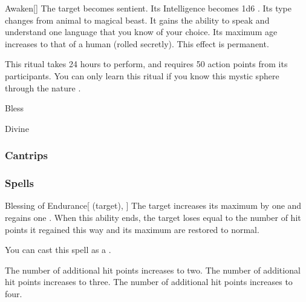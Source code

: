 \lowercase{\hypertarget{spell:Awaken}{}}\label{spell:Awaken}
\begin{apability}[Rank 6]{\hypertarget{spell:Awaken}{Awaken}}[]
The target becomes sentient.
Its Intelligence becomes 1d6 .
Its type changes from animal to magical beast.
It gains the ability to speak and understand one language that you know of your choice.
Its maximum age increases to that of a human (rolled secretly).
This effect is permanent.

This ritual takes 24 hours to perform, and requires 50 action points from its participants.
You can only learn this ritual if you know this mystic sphere through the nature .
\end{apability}
\vspace{0.25em}


\newpage
\begin{spellsection}{Bless}

\begin{spellheader}
\end{spellheader}


 Divine

\subsubsection{Cantrips}


\end{spellsection}


\subsubsection{Spells}


\lowercase{\hypertarget{spell:Blessing of Endurance}{}}\label{spell:Blessing of Endurance}
\begin{attuneability}[Rank 1]{\hypertarget{spell:Blessing of Endurance}{Blessing of Endurance}}[ (target), ]
The target increases its maximum  by one and regains one .
When this ability ends, the target loses  equal to the number of hit points it regained this way and its maximum  are restored to normal.

You can cast this spell as a .

\rankline
{} The number of additional hit points increases to two.
 The number of additional hit points increases to three.
 The number of additional hit points increases to four.
\end{attuneability}
\vspace{0.25em}



